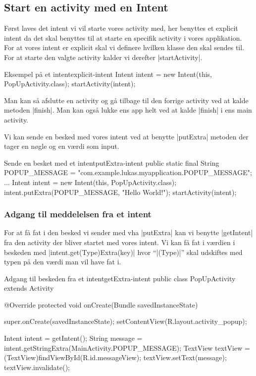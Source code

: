 \subsection{Start en activity med en Intent}

Først laves det intent vi vil starte vores activity med, her benyttes et explicit intent da det skal benyttes til at starte en specifik activity i vores applikation. For at vores intent er explicit skal vi definere hvilken klasse den skal sendes til. For at starte den valgte activity kalder vi derefter \JavaInline|startActivity|.

\begin{JavaCode}{Eksempel på et intent}{explicit-intent}
	Intent intent = new Intent(this, PopUpActivity.class);
	startActivity(intent);
\end{JavaCode}

Man kan så afslutte en activity og gå tilbage til den forrige activity ved at kalde metoden \JavaInline|finish|. Man kan også lukke ens app helt ved at kalde \JavaInline|finish| i ens main activity.

Vi kan sende en besked med vores intent ved at benytte \JavaInline|putExtra| metoden der tager en nøgle og en værdi som input.

\begin{JavaCode}{Sende en besket med et intent}{putExtra-intent}
	public static final String POPUP_MESSAGE = "com.example.lukas.myapplication.POPUP_MESSAGE";
	...
	Intent intent = new Intent(this, PopUpActivity.class);
	intent.putExtra(POPUP_MESSAGE, "Hello World!");
	startActivity(intent);
\end{JavaCode}

\subsubsection{Adgang til meddelelsen fra et intent}

For at få fat i den besked vi sender med vha \JavaInline|putExtra| kan vi benytte \JavaInline|getIntent| fra den activity der bliver startet med vores intent. Vi kan få fat i værdien i beskeden med \JavaInline|intent.get(Type)Extra(key)|  hvor ``\JavaInline|(Type)|'' skal udskiftes med typen på den værdi man vil have fat i.

\begin{JavaCode}{Adgang til beskeden fra et intent}{getExtra-intent}
	public class PopUpActivity extends Activity {
		
		@Override
		protected void onCreate(Bundle savedInstanceState) {
			super.onCreate(savedInstanceState);
			setContentView(R.layout.activity_popup);
			
			Intent intent = getIntent();
			String message = intent.getStringExtra(MainActivity.POPUP_MESSAGE);
			TextView textView = (TextView)findViewById(R.id.messageView);
			textView.setText(message);
			textView.invalidate();
		}
	}
\end{JavaCode}


